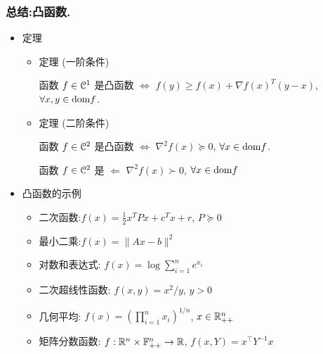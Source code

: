 \documentclass[handout,10pt]{beamer}
\begin{document}
\begin{frame}
\frametitle{总结:凸函数.}
\begin{itemize}
	\item 定理
	\begin{itemize}
		
		\item 定理  (一阶条件\doublestar)
		
		函数 $f\in \mathcal{C}^1$ 是凸函数
		$\Leftrightarrow$ $f(y) \geq f(x) + \nabla f(x)^T (y-x)$, $
		\forall x,y \in \textnormal{dom} f$.
		
		
		\item 定理 (二阶条件\mystar)
		
		
		函数 $f\in \mathcal{C}^2$ 是凸函数
		$\Leftrightarrow$ $ \nabla^2 f(x)\succeq 0$, $
		\forall x \in \textnormal{dom} f$.
		
		函数 $f\in \mathcal{C}^2$ 是 
		$\Leftarrow$  $ \nabla^2 f(x)\succ 0$, $ \forall x \in \textnormal{dom} f$
	\end{itemize}
\end{itemize}

\begin{itemize}
	
	\item 凸函数的示例
	
	\begin{itemize}
		\item 二次函数:\doublestar $f(x) = \frac{1}{2} x^T Px + c^T x +r $, $P\succeq 0$
		
		\item 最小二乘:\doublestar $f(x) = \|Ax-b\|^2$
		
		
		\item 对数和表达式: $f(x) = \log \sum_{i=1}^n e^{x_i}$
		
	\end{itemize}
	
	
	
	\begin{itemize}
		
		\item 二次超线性函数: $f(x,y) = x^2/y$, $y>0$
		
		
		\item 几何平均: $f(x)= (\prod_{i=1}^n x_i)^{1/n}$, $x\in \mathbb{R}^n_{++}$
		
		\item 矩阵分数函数: $f:\mathbb{R}^n\times \mathbb{F}^n_{++} \rightarrow \mathbb{R}$,
		$f(x,Y) = x^{\top}Y^{-1}x $
		
	\end{itemize}
\end{itemize}

\end{frame}
\end{document}
